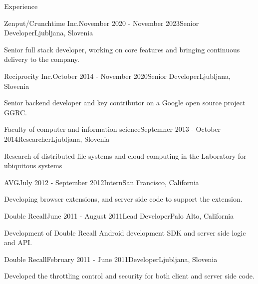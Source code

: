 \documentclass{resume} %
\begin{document}
\begin{rSection}{Experience}

\begin{rSubsection}{Zenput/Crunchtime Inc.}{November 2020 - November 2023}{Senior Developer}{Ljubljana, Slovenia}
\item Senior full stack developer, working on core features and bringing continuous delivery to the company.
\end{rSubsection}


\begin{rSubsection}{Reciprocity Inc.}{October 2014 - November 2020}{Senior Developer}{Ljubljana, Slovenia}
\item Senior backend developer and key contributor on a Google open source project GGRC.
\end{rSubsection}


\begin{rSubsection}{Faculty of computer and information science}{Septemner 2013 - October 2014}{Researcher}{Ljubljana, Slovenia}
\item Research of distributed file systems and cloud computing in the Laboratory for ubiquitous systems
\end{rSubsection}


\begin{rSubsection}{AVG}{July 2012 - September 2012}{Intern}{San Francisco, California}
\item Developing browser extensions, and server side code to support the extension.
\end{rSubsection}


\begin{rSubsection}{Double Recall}{June 2011 - August 2011}{Lead Developer}{Palo Alto, California}
\item Development of Double Recall Android development SDK and server side logic and API.
\end{rSubsection}


\begin{rSubsection}{Double Recall}{February 2011 - June 2011}{Developer}{Ljubljana, Slovenia}
\item Developed the throttling control and security for both client and server side code.
\end{rSubsection}


\end{rSection}
\end{document}

